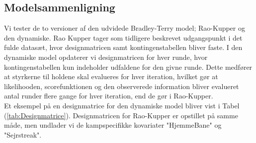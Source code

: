 \documentclass[11pt,a4paper]{article}
\begin{document}
\subsection{Modelsammenligning}
Vi tester de to versioner af den udvidede Bradley-Terry model; Rao-Kupper og den dynamiske. Rao Kupper tager som tidligere beskrevet udgangspunkt i det fulde datasæt, hvor designmatricen samt kontingenstabellen bliver faste. I den dynamiske model opdaterer vi designmatricen for hver runde, hvor kontingenstabellen kun indeholder udfaldene for den givne runde. Dette medfører at styrkerne til holdene skal evalueres for hver iteration, hvilket gør at likelihooden, scorefunktionen og den observerede information bliver evalueret antal runder flere gange for hver iteration, end de gør i Rao-Kupper.\\
Et eksempel på en designmatrice for den dynamiske model bliver vist i Tabel (\ref{tab:Designmatrice}). Designmatricen for Rao-Kupper er opstillet på samme måde, men undlader vi de kampspecifikke kovariater "HjemmeBane" og "Sejrstreak". 
\end{document}
